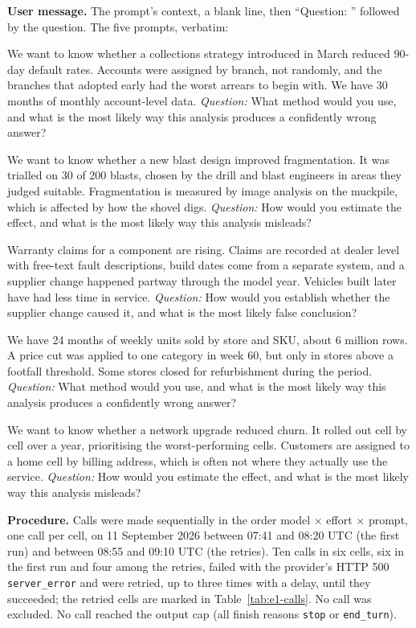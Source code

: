 \documentclass[11pt]{article}
\begin{document}
\textbf{User message.} The prompt's context, a blank line, then ``Question: '' followed by
the question. The five prompts, verbatim:
\begin{description}[nosep,leftmargin=2em]
\item[1. banking] We want to know whether a collections strategy introduced in March reduced 90-day default rates. Accounts were assigned by branch, not randomly, and the branches that adopted early had the worst arrears to begin with. We have 30 months of monthly account-level data. \emph{Question:} What method would you use, and what is the most likely way this analysis produces a confidently wrong answer?
\item[2. mining] We want to know whether a new blast design improved fragmentation. It was trialled on 30 of 200 blasts, chosen by the drill and blast engineers in areas they judged suitable. Fragmentation is measured by image analysis on the muckpile, which is affected by how the shovel digs. \emph{Question:} How would you estimate the effect, and what is the most likely way this analysis misleads?
\item[3. automotive] Warranty claims for a component are rising. Claims are recorded at dealer level with free-text fault descriptions, build dates come from a separate system, and a supplier change happened partway through the model year. Vehicles built later have had less time in service. \emph{Question:} How would you establish whether the supplier change caused it, and what is the most likely false conclusion?
\item[4. retail] We have 24 months of weekly units sold by store and SKU, about 6 million rows. A price cut was applied to one category in week 60, but only in stores above a footfall threshold. Some stores closed for refurbishment during the period. \emph{Question:} What method would you use, and what is the most likely way this analysis produces a confidently wrong answer?
\item[5. telecoms] We want to know whether a network upgrade reduced churn. It rolled out cell by cell over a year, prioritising the worst-performing cells. Customers are assigned to a home cell by billing address, which is often not where they actually use the service. \emph{Question:} How would you estimate the effect, and what is the most likely way this analysis misleads?
\end{description}

\textbf{Procedure.} Calls were made sequentially in the order model $\times$ effort
$\times$ prompt, one call per cell, on 11 September 2026 between 07:41 and 08:20 UTC
(the first run) and between 08:55 and 09:10 UTC (the retries). Ten calls in six cells, six in the first run and four among the retries, failed with the provider's HTTP 500
\texttt{server\_error} and were retried, up to three times with a delay, until they succeeded;
the retried cells are marked in Table~\ref{tab:e1-calls}. No call was excluded. No call
reached the output cap (all finish reasons \texttt{stop} or \texttt{end\_turn}).
\end{document}

